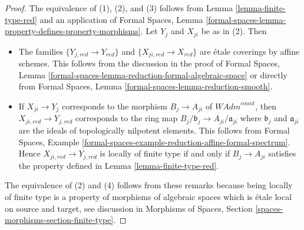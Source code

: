 \documentclass[10pt,a4paper]{amsart}
\theoremstyle{plain}
\theoremstyle{definition}
\theoremstyle{remark}
\numberwithin{equation}{subsection}
\begin{document}
\begin{proof}
The equivalence of (1), (2), and (3) follows from
Lemma \ref{lemma-finite-type-red} and an application of
Formal Spaces, Lemma
\ref{formal-spaces-lemma-property-defines-property-morphisms}.
Let $Y_j$ and $X_{ji}$ be as in (2). Then
\begin{itemize}
\item The families $\{Y_{j, red} \to Y_{red}\}$ and
$\{X_{ji, red} \to X_{red}\}$ are \'etale coverings by affine schemes.
This follows from the discussion in the proof of
Formal Spaces, Lemma
\ref{formal-spaces-lemma-reduction-formal-algebraic-space}
or directly from
Formal Spaces, Lemma \ref{formal-spaces-lemma-reduction-smooth}.
\item If $X_{ji} \to Y_j$ corresponds to the morphism
$B_j \to A_{ji}$ of $\textit{WAdm}^{count}$, then
$X_{ji, red} \to Y_{j, red}$ corresponds to the ring map
$B_j/\mathfrak b_j \to A_{ji}/\mathfrak a_{ji}$ where
$\mathfrak b_j$ and $\mathfrak a_{ji}$ are the ideals of
topologically nilpotent elements. This follows from
Formal Spaces, Example
\ref{formal-spaces-example-reduction-affine-formal-spectrum}.
Hence $X_{ji, red} \to Y_{j, red}$ is locally of finite type
if and only if $B_j \to A_{ji}$ satisfies the
property defined in Lemma \ref{lemma-finite-type-red}.
\end{itemize}
The equivalence of (2) and (4) follows from these remarks because
being locally of finite type is a property of morphisms of algebraic
spaces which is \'etale local on source and target, see discussion in
Morphisms of Spaces, Section \ref{spaces-morphisms-section-finite-type}.
\end{proof}
\end{document}
